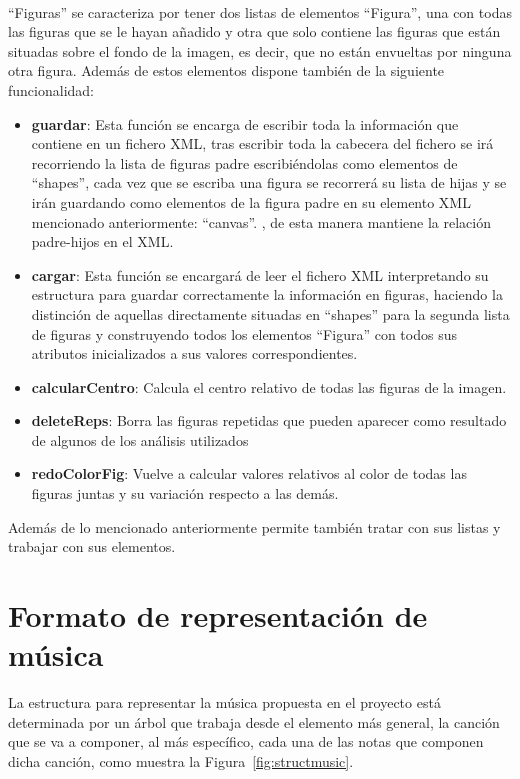 \\``Figuras'' se caracteriza por tener dos listas de elementos ``Figura'', una con todas las figuras que se le hayan añadido y otra que solo contiene las figuras que están situadas sobre el fondo de la imagen, es decir, que no están envueltas por ninguna otra figura. Además de estos elementos dispone también de la siguiente funcionalidad:
\begin{itemize}
\item \textbf{guardar}: Esta función se encarga de escribir toda la información que contiene en un fichero XML, tras escribir toda la cabecera del fichero se irá recorriendo la lista de figuras padre escribiéndolas como elementos de ``shapes'', cada vez que se escriba una figura se recorrerá su lista de hijas y se irán guardando como elementos de la figura padre en su elemento XML mencionado anteriormente: ``canvas''. , de esta manera mantiene la relación padre-hijos en el XML.
\item \textbf{cargar}: Esta función se encargará de leer el fichero XML interpretando su estructura para guardar correctamente la información en figuras, haciendo la distinción de aquellas directamente situadas en ``shapes'' para la segunda lista de figuras y construyendo todos los elementos ``Figura'' con todos sus atributos inicializados a sus valores correspondientes.
\item \textbf{calcularCentro}: Calcula el centro relativo de todas las figuras de la imagen.
\item \textbf{deleteReps}: Borra las figuras repetidas que pueden aparecer como resultado de algunos de los análisis utilizados 
\item \textbf{redoColorFig}: Vuelve a calcular valores relativos al color de todas las figuras juntas y su variación respecto a las demás.  
\end{itemize}
Además de lo mencionado anteriormente permite también tratar con sus listas y trabajar con sus elementos.

\section{Formato de representación de música}


La estructura para representar la música propuesta en el proyecto está determinada por un árbol que trabaja desde el elemento más general, la canción que se va a componer, al más específico, cada una de las notas que componen dicha canción, como muestra la Figura~\ref{fig:structmusic}.\\
	
